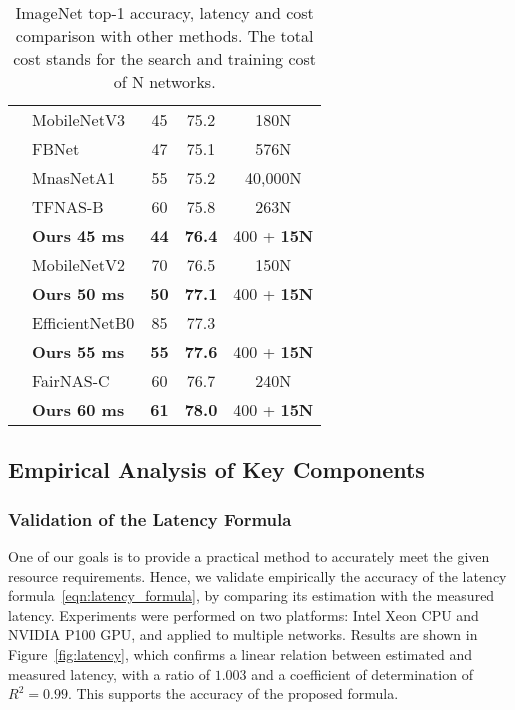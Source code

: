\documentclass[dvipsnames,table,xcdraw]{article}
\begin{document}
\begin{table}[t]
\begin{tabular}{c|l|c|c|c|}
         & MobileNetV3 & 45 & 75.2 & 180N \\ 
         & FBNet & 47 & 75.1 & 576N \\ 
         & MnasNetA1 & 55 & 75.2 & 40,000N \\ 
         & TFNAS-B & 60 & 75.8 & 263N \\ 
         
         & \textbf{Ours 45 ms} & \textbf{44} & \textbf{76.4} & 400 + \textbf{15N}\\ \cline{2-5}
         
         & MobileNetV2 & 70 & 76.5 & 150N \\ 
         & \textbf{Ours 50 ms} & \textbf{50} & \textbf{77.1} & 400 + \textbf{15N} \\ \cline{2-5}
         & EfficientNetB0 & 85 & 77.3 &  \\ 
         & \textbf{Ours 55 ms} & \textbf{55} & \textbf{77.6} &  400 + \textbf{15N}\\ \cline{2-5}
         & FairNAS-C & 60 & 76.7 & 240N \\ 
         & \textbf{Ours 60 ms} & \textbf{61} & \textbf{78.0} & 400 + \textbf{15N}\\ \hline
    \end{tabular}
    \caption{ImageNet top-1 accuracy, latency and cost comparison with other methods. The total cost stands for the search and training cost of N networks.} \label{tab:exp}
\end{table} \vspace{-0.2em}
\subsection{Empirical Analysis of Key Components}
\vspace{-0.2em}
\subsubsection{Validation of the Latency Formula}\label{sec:validate_latency}
\vspace{-0.2em}
One of our goals is to provide a practical method to accurately meet the given resource requirements.
Hence, we validate empirically the accuracy of the latency formula~\eqref{eqn:latency_formula}, by comparing its estimation with the measured latency. Experiments were performed on two platforms: Intel Xeon CPU and NVIDIA P100 GPU, and applied to multiple networks. Results are shown in Figure~\ref{fig:latency}, which confirms a linear relation between estimated and measured latency, with a ratio of $1.003$ and a coefficient of determination of $R^2=0.99$. This supports the accuracy of the proposed formula.
\end{document}
